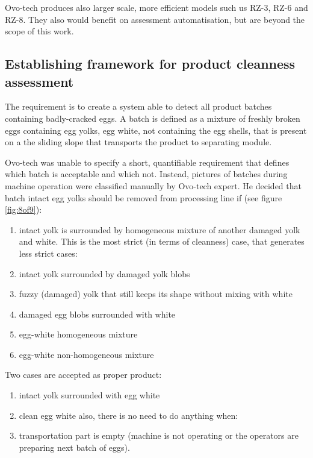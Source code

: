 \documentclass[12pt,twoside,a4paper]{article}
\begin{document}
Ovo-tech produces also larger scale, more efficient models such us RZ-3, RZ-6 and RZ-8.
They also would benefit on assessment automatisation, but are beyond the scope of this work.

\newpage
\subsection{Establishing framework for product cleanness assessment}

The requirement is to create a system able to detect all product batches containing badly-cracked eggs.
A batch is defined as a mixture of freshly broken eggs containing egg yolks, egg white, not containing the egg shells, that is present on a the sliding slope that transports the product to separating module.

Ovo-tech was unable to specify a short, quantifiable requirement that defines which batch is acceptable and which not. Instead, pictures of batches during machine operation were classified manually by Ovo-tech expert. He decided that batch intact egg yolks should be removed from processing line if (see figure \ref{fig:8of9}):

\begin{enumerate}
\item intact yolk is surrounded by homogeneous mixture of another damaged yolk and white.
This is the most strict (in terms of cleanness) case, that generates less strict cases:
\item intact yolk surrounded by damaged yolk blobs
\item fuzzy (damaged) yolk that still keeps its shape without mixing with white
\item damaged egg blobs surrounded with white
\item egg-white homogeneous mixture
\item egg-white non-homogeneous mixture
\end{enumerate}
Two cases are accepted as proper product:
\begin{enumerate}[resume]
\item intact yolk surrounded with egg white
\item clean egg white
also, there is no need to do anything when:
\item transportation part is empty (machine is not operating or the operators are preparing next batch of eggs).
\end{enumerate}

 
\end{document}
